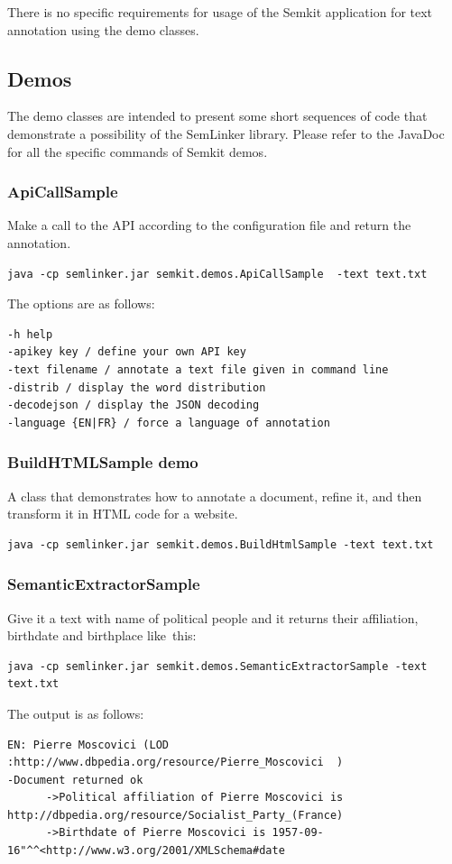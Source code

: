 \documentclass[11pt]{article}
\newcommand{\seml}{SemLinker}
\newcommand{\semk}{Semkit}
\begin{document}
There is no specific requirements for usage of the \semk{} application for text annotation using the demo classes. 

\subsection{Demos}
\label{ssec:demos}
The demo classes are intended to present some short sequences of code that demonstrate a possibility of the \seml{} library. 
Please refer to the JavaDoc for all the specific commands of \semk{} demos.

\subsubsection{ApiCallSample}
\label{sssec:apicall}
Make a call to the API according to the configuration file and return the annotation. 
\begin{lstlisting}
java -cp semlinker.jar semkit.demos.ApiCallSample  -text text.txt
\end{lstlisting}
The options are as follows:
\begin{lstlisting}
-h help
-apikey key / define your own API key
-text filename / annotate a text file given in command line
-distrib / display the word distribution
-decodejson / display the JSON decoding
-language {EN|FR} / force a language of annotation
\end{lstlisting}

\subsubsection{BuildHTMLSample demo}
\label{sssec:buildhtml}
A class that demonstrates how to annotate a document, refine it, and then transform it in HTML code for a website. 
\begin{lstlisting}
java -cp semlinker.jar semkit.demos.BuildHtmlSample -text text.txt
\end{lstlisting}

\subsubsection{SemanticExtractorSample}
\label{sssec:semextr}
Give it a text with name of political people and it returns their affiliation, birthdate and birthplace like this:
\begin{lstlisting}
java -cp semlinker.jar semkit.demos.SemanticExtractorSample -text text.txt
\end{lstlisting}
The output is as follows:
\begin{lstlisting}
EN: Pierre Moscovici (LOD :http://www.dbpedia.org/resource/Pierre_Moscovici  ) 
-Document returned ok 
      ->Political affiliation of Pierre Moscovici is http://dbpedia.org/resource/Socialist_Party_(France) 
      ->Birthdate of Pierre Moscovici is 1957-09-16"^^<http://www.w3.org/2001/XMLSchema#date 
\end{lstlisting}
\end{document}
